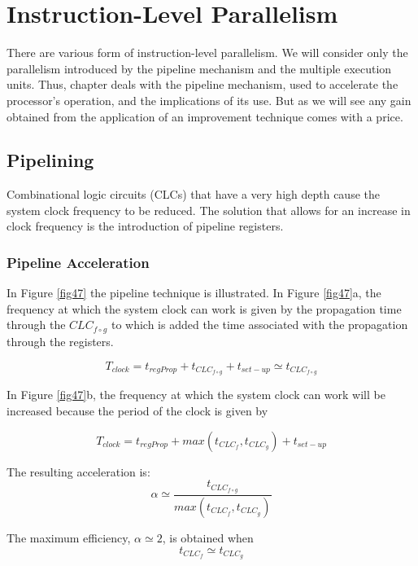 \chapter{Instruction-Level Parallelism}\label{lect5}
\localtoc

There are various form of instruction-level parallelism. We will consider  only the parallelism introduced by the pipeline mechanism and the multiple execution units.
Thus, chapter deals with the pipeline mechanism, used to accelerate the processor's operation, and the implications of its use. But as we will see any gain obtained from the application of an improvement technique comes with a price.

\section{Pipelining}

Combinational logic circuits (CLCs) that have a very high depth cause the system clock frequency to be reduced. The solution that allows for an increase in clock frequency is the introduction of pipeline registers.


\subsection{Pipeline Acceleration}

In Figure \ref{fig47} the pipeline technique is illustrated. In Figure \ref{fig47}a, the frequency at which the system clock can work is given by the propagation time through the $CLC_{f \circ g}$ to which is added the time associated with the propagation through the registers.



$$T_{clock} = t_{regProp} + t_{CLC_{f \circ g}} + t_{set-up} \simeq t_{CLC_{f \circ g}}$$

In Figure \ref{fig47}b,  the frequency at which the system clock can work will be increased because the period of the clock is given by

$$T_{clock} = t_{regProp} + max(t_{CLC_{f}}, t_{CLC_{g}}) + t_{set-up}$$

The resulting acceleration is:
$$\alpha \simeq \frac{t_{CLC_{f \circ g}}}{max(t_{CLC_{f}}, t_{CLC_{g}})}$$

The maximum efficiency, $\alpha \simeq 2$, is obtained when
$$t_{CLC_{f}} \simeq t_{CLC_{g}}$$

